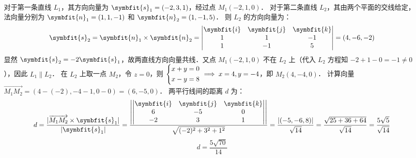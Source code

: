 \begin{solution}

    对于第一条直线 $L_1$，其方向向量为 $\symbfit{s}_1 = (-2, 3, 1)$，经过点 $M_1(-2, 1, 0)$．
    对于第二条直线 $L_2$，其由两个平面的交线给定，法向量分别为 $\symbfit{n}_1 = (1, 1, -1)$ 和 $\symbfit{n}_2 = (1, -1, 5)$．
    则 $L_2$ 的方向向量为：
    \begin{equation}
        \symbfit{s}_2 = \symbfit{n}_1 \times \symbfit{n}_2 = \begin{vmatrix} \symbfit{i} & \symbfit{j} & \symbfit{k} \\ 1 & 1 & -1 \\ 1 & -1 & 5 \end{vmatrix} = (4, -6, -2)
    \end{equation}
    显然 $\symbfit{s}_2 = -2 \symbfit{s}_1$，故两直线方向向量共线．又点 $M_1(-2, 1, 0)$ 不在 $L_2$ 上（代入 $L_2$ 方程知 $-2+1-0 = -1 \neq 0$），因此 $L_1 \parallel L_2$．
    在 $L_2$ 上取一点 $M_2$，令 $z=0$，则 $\begin{dcases} x+y=0 \\ x-y=8 \end{dcases} \implies x=4, y=-4$，即 $M_2(4, -4, 0)$．
    计算向量 $\overrightarrow{M_1 M_2} = (4 - (-2), -4 - 1, 0 - 0) = (6, -5, 0)$．
    两平行线间的距离 $d$ 为：
    \begin{equation}
        d = \frac{|\overrightarrow{M_1 M_2} \times \symbfit{s}_1|}{|\symbfit{s}_1|} = \frac{\left| \begin{vmatrix} \symbfit{i} & \symbfit{j} & \symbfit{k} \\ 6 & -5 & 0 \\ -2 & 3 & 1 \end{vmatrix} \right|}{\sqrt{(-2)^2 + 3^2 + 1^2}} = \frac{|(-5, -6, 8)|}{\sqrt{14}} = \frac{\sqrt{25 + 36 + 64}}{\sqrt{14}} = \frac{5\sqrt{5}}{\sqrt{14}}
    \end{equation}
    \begin{equation}
        \boxed{d = \frac{5\sqrt{70}}{14}}
    \end{equation}



\end{solution}
